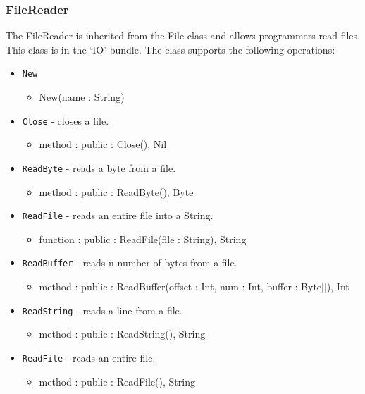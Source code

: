 \documentclass[12pt]{article}
\begin{document}
\subsubsection{FileReader}
The FileReader is inherited from the File class and allows programmers read files.  This class is in the `IO' bundle.  The class supports the following operations:
\begin{itemize}
\item \texttt{New}
  \begin{itemize}
  \item New(name : String)
  \end{itemize}
\item \texttt{Close} - closes a file.
  \begin{itemize}
  \item method : public : Close(), Nil
  \end{itemize}
\item \texttt{ReadByte} - reads a byte from a file.
  \begin{itemize}
  \item method : public : ReadByte(), Byte
  \end{itemize} 
\item \texttt{ReadFile} - reads an entire file into a String.
  \begin{itemize}
  \item function : public : ReadFile(file : String), String
  \end{itemize}  
\item \texttt{ReadBuffer} - reads n number of bytes from a file.
  \begin{itemize}
  \item method : public : ReadBuffer(offset : Int, num : Int, buffer : Byte[]), Int
  \end{itemize} 
\item \texttt{ReadString} - reads a line from a file.
  \begin{itemize}
  \item method : public : ReadString(), String
  \end{itemize}  
\item \texttt{ReadFile} - reads an entire file.
  \begin{itemize}
  \item method : public : ReadFile(), String
  \end{itemize}
\end{itemize}
\end{document}
